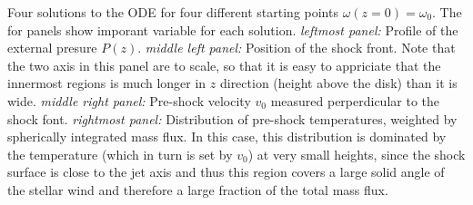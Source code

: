 \label{fig:omega_0}
Four solutions to the ODE for four different starting points $\omega(z=0)=\omega_0$. The for panels show imporant variable for each solution. \emph{leftmost panel:} Profile of the external presure $P(z)$. \emph{middle left panel:} Position of the shock front. Note that the two axis in this panel are to scale, so that it is easy to appriciate that the innermost regions is much longer in $z$ direction (height above the disk) than it is wide. \emph{middle right panel:} Pre-shock velocity $v_0$ measured perperdicular to the shock font. \emph{rightmost panel:} Distribution of pre-shock temperatures, weighted by spherically integrated mass flux. In this case, this distribution is dominated by the temperature (which in turn is set by $v_0$) at very small heights, since the shock surface is close to the jet axis and thus this region covers a large solid angle of the stellar wind and therefore a large fraction of the total mass flux.
